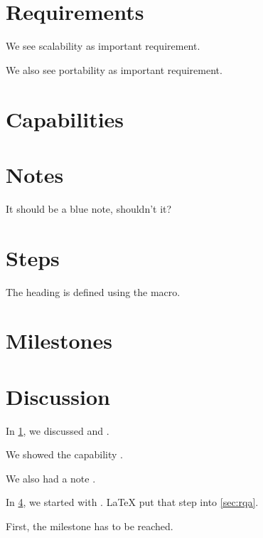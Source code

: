\documentclass{article}
\begin{document}
\tableofcontents
\clearpage







\section{Requirements}
\label{secreqs}
We see scalability as important requirement.

We also see portability as important requirement.


\section{Capabilities}

\section{Notes}
 It should be a blue note, shouldn't it?

\section{Steps}
\label{sec:steps}

\label{sec:rqa}
The heading is defined using the macro.

\section{Milestones}

\clearpage


\section{Discussion}
In \cref{secreqs}, we discussed  and .

We showed the capability .

We also had a note .

In \cref{sec:steps}, we started with .
\LaTeX{} put that step into \cref{sec:rqa}.

First, the milestone  has to be reached.
\end{document}
